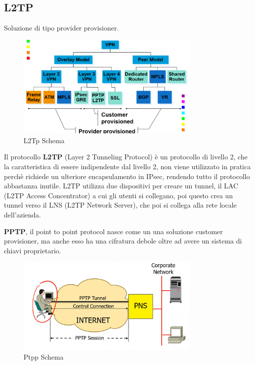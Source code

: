 \documentclass[12pt]{article}
\begin{document}
\subsection{L2TP}
Soluzione di tipo provider provisioner.
\begin{figure}[H]
    \centering
    \includegraphics[width=0.8\textwidth]{l2tp-schema.png}
    \caption{L2Tp Schema}
    \label{fig:l2tp-schema}
\end{figure}
Il protocollo \textbf{L2TP} (Layer 2 Tunneling Protocol) \`e un protocollo di livello 2, che la caratteristica di essere indipendente dal livello 2, non viene utilizzato in pratica perch\`e richiede un ulteriore encapsulamento in IPsec, rendendo tutto il protocollo abbastanza inutile. L2TP utilizza due dispositivi per creare un tunnel, il LAC (L2TP Access Concentrator) a cui gli utenti si collegano, poi questo crea un tunnel verso il LNS (L2TP Network Server), che poi si collega alla rete locale dell'azienda.



\textbf{PPTP}, il point to point protocol nasce come un una soluzione customer provisioner, ma anche esso ha una cifratura debole oltre ad avere un sistema di chiavi proprietario.
\begin{figure}[H]
    \centering
    \includegraphics[width=0.8\textwidth]{ptpp-schema.png}
    \caption{Ptpp Schema}
    \label{fig:ptpp-schema}
\end{figure}
\end{document}
